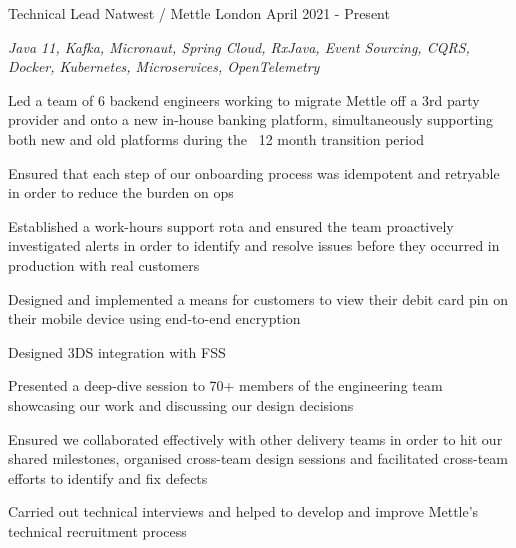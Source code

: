 

\begin{cventries}


  \cventry
    {Technical Lead} %
    {Natwest / Mettle} %
    {London} %
    {April 2021 - Present} %
    {
      \begin{cvitems} %
        \item {\itshape{Java 11, Kafka, Micronaut, Spring Cloud, RxJava, Event Sourcing, CQRS, Docker, Kubernetes, Microservices, OpenTelemetry}}
        \item {Led a team of 6 backend engineers working to migrate Mettle off a 3rd party provider and onto a new in-house banking platform, simultaneously supporting both new and old platforms during the ~12 month transition period}        
        \item {Ensured that each step of our onboarding process was idempotent and retryable in order to reduce the burden on ops}
        \item {Established a work-hours support rota and ensured the team proactively investigated alerts in order to identify and resolve issues before they occurred in production with real customers}
        \item {Designed and implemented a means for customers to view their debit card pin on their mobile device using end-to-end encryption}
        \item {Designed 3DS integration with FSS}
        \item {Presented a deep-dive session to 70+ members of the engineering team showcasing our work and discussing our design decisions}
        \item {Ensured we collaborated effectively with other delivery teams in order to hit our shared milestones, organised cross-team design sessions and facilitated cross-team efforts to identify and fix defects}
        \item {Carried out technical interviews and helped to develop and improve Mettle's technical recruitment process}
      \end{cvitems} 
    }


\end{cventries}
